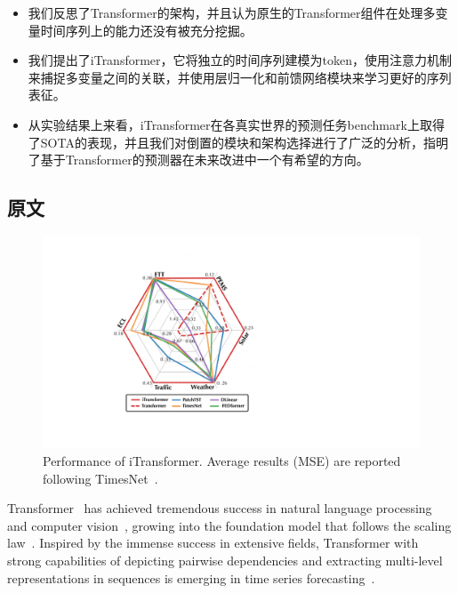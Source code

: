 \documentclass[twoside,12pt]{article}
\begin{document}
\begin{itemize}
  \item 我们反思了Transformer的架构，并且认为原生的Transformer组件在处理多变量时间序列上的能力还没有被充分挖掘。
  \item 我们提出了iTransformer，它将独立的时间序列建模为token，使用注意力机制来捕捉多变量之间的关联，并使用层归一化和前馈网络模块来学习更好的序列表征。
  \item 从实验结果上来看，iTransformer在各真实世界的预测任务benchmark上取得了SOTA的表现，并且我们对倒置的模块和架构选择进行了广泛的分析，指明了基于Transformer的预测器在未来改进中一个有希望的方向。
\end{itemize}

\subsection{原文}

\begin{figure}[t]
  \begin{center}
    \includegraphics[width=0.5\columnwidth]{pic/radar.pdf}
    \vspace{-10pt}
    \caption{\small{Performance of iTransformer. Average results (MSE) are reported following TimesNet~\citeyearpar{Timesnet}}.}
    \label{fig:radar}
  \end{center}
  \vspace{-14pt}
\end{figure}


Transformer~\citep{Transformer} has achieved tremendous success in natural language processing~\citep{brown2020language} and computer vision~\citep{dosovitskiy2020image}, growing into the foundation model that follows the scaling law~\citep{kaplan2020scaling}. Inspired by the immense success in extensive fields, Transformer with strong capabilities of depicting pairwise dependencies and extracting multi-level representations in sequences is emerging in time series forecasting~\citep{Informer, Autoformer, PatchTST}.
\end{document}
